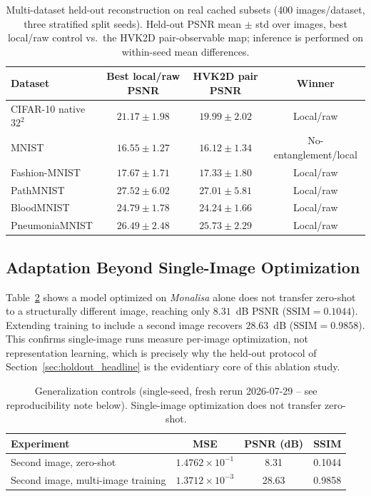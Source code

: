 \documentclass[11pt]{article}
\begin{document}
\begin{table}[H]
\centering
\caption{Multi-dataset held-out reconstruction on real cached subsets (400 images/dataset, three stratified split seeds). Held-out PSNR mean $\pm$ std over images, best local/raw control vs.\ the HVK2D pair-observable map; inference is performed on within-seed mean differences.}
\label{tab:multi_dataset_reconstruction}
\scriptsize
\begin{tabular}{lccc}
\toprule
Dataset & Best local/raw PSNR & HVK2D pair PSNR & Winner \\
\midrule
CIFAR-10 native $32^2$ & $21.17{\pm}1.98$ & $19.99{\pm}2.02$ & Local/raw \\
MNIST & $16.55{\pm}1.27$ & $16.12{\pm}1.34$ & No-entanglement/local \\
Fashion-MNIST & $17.67{\pm}1.71$ & $17.33{\pm}1.80$ & Local/raw \\
PathMNIST & $27.52{\pm}6.02$ & $27.01{\pm}5.81$ & Local/raw \\
BloodMNIST & $24.79{\pm}1.78$ & $24.24{\pm}1.66$ & Local/raw \\
PneumoniaMNIST & $26.49{\pm}2.48$ & $25.73{\pm}2.29$ & Local/raw \\
\bottomrule
\end{tabular}
\end{table}

\subsection{Adaptation Beyond Single-Image Optimization}
Table~\ref{tab:generalization_controls} shows a model optimized on \textit{Monalisa} alone does not transfer zero-shot to a structurally different image, reaching only $8.31$~dB PSNR ($\mathrm{SSIM}=0.1044$). Extending training to include a second image recovers $28.63$~dB ($\mathrm{SSIM}=0.9858$). This confirms single-image runs measure per-image optimization, not representation learning, which is precisely why the held-out protocol of Section~\ref{sec:holdout_headline} is the evidentiary core of this ablation study.

\begin{table}[H]
\centering
\caption{Generalization controls (single-seed, fresh rerun 2026-07-29 -- see reproducibility note below). Single-image optimization does not transfer zero-shot.}
\label{tab:generalization_controls}
\scriptsize
\begin{tabular}{lccc}
\toprule
Experiment & MSE & PSNR (dB) & SSIM \\
\midrule
Second image, zero-shot & $1.4762\times10^{-1}$ & 8.31 & 0.1044 \\
Second image, multi-image training & $1.3712\times10^{-3}$ & 28.63 & 0.9858 \\
\bottomrule
\end{tabular}
\end{table}
\end{document}

